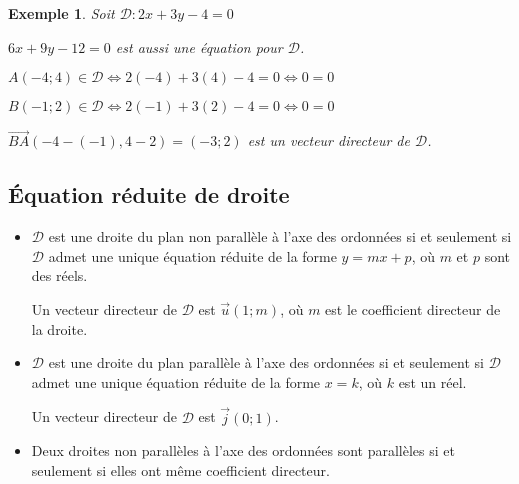 \documentclass[a4paper,11pt]{article}
\theoremstyle{break}
\newcounter{enonce}
\newtheorem{exemple}[enonce]{Exemple}
\begin{document}
    \begin{exemple}
    Soit $\mathcal{D}:2 x+3 y-4=0$
    \begin{center}

   
   $6x+9y-12=0$ est aussi une équation pour $\mathcal{D}$.
   
   $A(-4;4) \in \mathcal{D} \iff {2(-4)+3(4)-4=0} \iff {0=0}$
   
   
   $B(-1;2) \in \mathcal{D} \iff {2(-1)+3(2)-4=0} \iff {0=0}$
   
  
   $\vec{BA}(-4-(-1),4-2)=(-3;2)$ est un {vecteur directeur} de $\mathcal{D}$.
   \end{center}
   \end{exemple}
   
   
   
   \subsection{\'Equation réduite de droite}
   
     \begin{theorem}
     
     \begin{itemize}
      \item 
      $\mathcal{D}$ est une droite du plan non parallèle à l'axe des ordonnées si et seulement si
    $\mathcal{D}$ admet une {unique} équation réduite de la forme $y=mx+p$, où $m$ et $p$ sont des réels.
    
    Un vecteur directeur de $\mathcal{D}$ est $\vec{u}{(1;m)}$, où $m$ est le coefficient directeur
    de la droite.
    
    \item
    $\mathcal{D}$ est une droite du plan parallèle à l'axe des ordonnées si et seulement si
    $\mathcal{D}$ admet une unique équation réduite de la forme {$x=k$}, où $k$ est un réel.
    
    Un vecteur directeur de $\mathcal{D}$ est $\vec{j}(0;1)$.
    
    \item Deux droites non parallèles à l'axe des ordonnées sont parallèles si et seulement si 
    elles ont même {coefficient directeur}.
     \end{itemize}
     
   \end{theorem}
\end{document}
